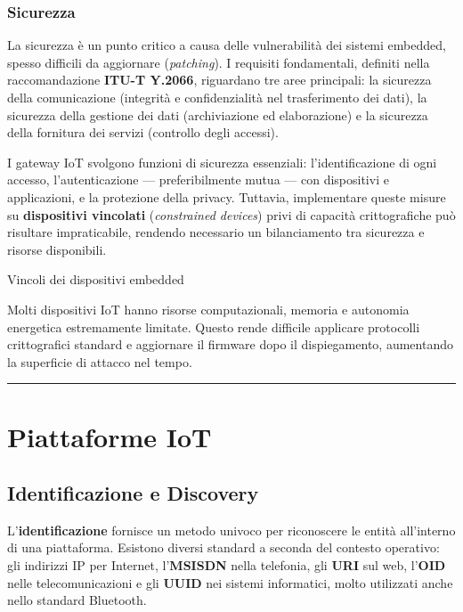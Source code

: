 \documentclass[
  italian,
  openany]{book}
\begin{document}
\subsection{Sicurezza}\label{sicurezza}

La sicurezza è un punto critico a causa delle vulnerabilità dei sistemi
embedded, spesso difficili da aggiornare (\emph{patching}). I requisiti
fondamentali, definiti nella raccomandazione \textbf{ITU-T Y.2066},
riguardano tre aree principali: la sicurezza della comunicazione
(integrità e confidenzialità nel trasferimento dei dati), la sicurezza
della gestione dei dati (archiviazione ed elaborazione) e la sicurezza
della fornitura dei servizi (controllo degli accessi).

I gateway IoT svolgono funzioni di sicurezza essenziali:
l'identificazione di ogni accesso, l'autenticazione --- preferibilmente
mutua --- con dispositivi e applicazioni, e la protezione della privacy.
Tuttavia, implementare queste misure su \textbf{dispositivi vincolati}
(\emph{constrained devices}) privi di capacità crittografiche può
risultare impraticabile, rendendo necessario un bilanciamento tra
sicurezza e risorse disponibili.

\begin{calloutwarning}{Vincoli dei dispositivi embedded}

Molti dispositivi IoT hanno risorse computazionali, memoria e autonomia
energetica estremamente limitate. Questo rende difficile applicare
protocolli crittografici standard e aggiornare il firmware dopo il
dispiegamento, aumentando la superficie di attacco nel tempo.

\end{calloutwarning}

\begin{center}\rule{0.5\linewidth}{0.5pt}\end{center}

\newpage

\chapter{Piattaforme IoT}\label{piattaforme-iot}

\section{Identificazione e Discovery}\label{identificazione-e-discovery}

L'\textbf{identificazione} fornisce un metodo univoco per riconoscere le
entità all'interno di una piattaforma. Esistono diversi standard a
seconda del contesto operativo: gli indirizzi IP per Internet,
l'\textbf{MSISDN} nella telefonia, gli \textbf{URI} sul web,
l'\textbf{OID} nelle telecomunicazioni e gli \textbf{UUID} nei sistemi
informatici, molto utilizzati anche nello standard Bluetooth.
\end{document}
